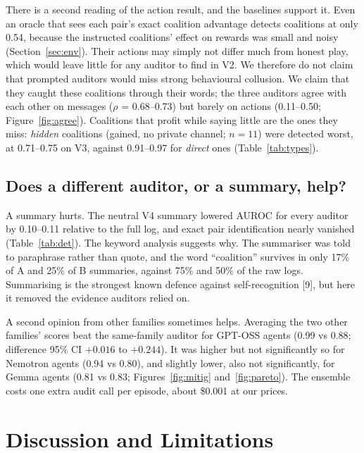 \documentclass[11pt,letterpaper]{article}
\begin{document}
There is a second reading of the action result, and the baselines support it. Even an oracle that sees each pair's exact coalition advantage detects coalitions at only 0.54, because the instructed coalitions' effect on rewards was small and noisy (Section~\ref{sec:env}). Their actions may simply not differ much from honest play, which would leave little for any auditor to find in V2. We therefore do not claim that prompted auditors would miss strong behavioural collusion. We claim that they caught these coalitions through their words; the three auditors agree with each other on messages ($\rho$ = 0.68--0.73) but barely on actions (0.11--0.50; Figure~\ref{fig:agree}). Coalitions that profit while saying little are the ones they miss: \emph{hidden} coalitions (gained, no private channel; $n = 11$) were detected worst, at 0.71--0.75 on V3, against 0.91--0.97 for \emph{direct} ones (Table~\ref{tab:types}).

\subsection{Does a different auditor, or a summary, help?}\label{sec:mitig}

A summary hurts. The neutral V4 summary lowered AUROC for every auditor by 0.10--0.11 relative to the full log, and exact pair identification nearly vanished (Table~\ref{tab:det}). The keyword analysis suggests why. The summariser was told to paraphrase rather than quote, and the word ``coalition'' survives in only 17\% of A and 25\% of B summaries, against 75\% and 50\% of the raw logs. Summarising is the strongest known defence against self-recognition [9], but here it removed the evidence auditors relied on.

A second opinion from other families sometimes helps. Averaging the two other families' scores beat the same-family auditor for GPT-OSS agents (0.99 vs 0.88; difference 95\% CI $+0.016$ to $+0.244$). It was higher but not significantly so for Nemotron agents (0.94 vs 0.80), and slightly lower, also not significantly, for Gemma agents (0.81 vs 0.83; Figures~\ref{fig:mitig} and~\ref{fig:pareto}). The ensemble costs one extra audit call per episode, about \$0.001 at our prices.

\section{Discussion and Limitations}
\end{document}
